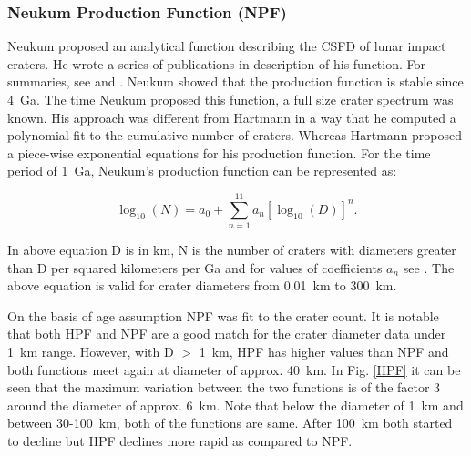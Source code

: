 \documentclass[11pt]{article}
\begin{document}
\subsubsection{Neukum Production Function (NPF)}
Neukum proposed an analytical function describing the CSFD of lunar impact craters. He wrote a series of publications in description of his function. For summaries, see \cite{neukum1994crater} and \cite{neukum1983meteoritenbombardement}. Neukum showed that the production function is stable since \SI{4}{Ga}. The time Neukum proposed this function, a full size crater spectrum was known. His approach was different from Hartmann in a way that he computed a polynomial fit to the cumulative number of craters. Whereas Hartmann proposed a piece-wise exponential equations for his production function. For the time period of \SI{1}{Ga}, Neukum's production function can be represented as:

\begin{equation}
\log_{10} (N) = a_0 + \sum_{n=1}^{11} a_n[\log_{10} (D)]^n.
\end{equation}

In above equation D is in km, N is the number of craters with diameters greater than D per squared kilometers per Ga and for values of coefficients $a_n$ see \cite{ivanov2002comparison}. The above equation is valid for crater diameters from \SI{0.01}{km} to \SI{300}{km}.

On the basis of age assumption NPF was fit to the crater count. It is notable that both HPF and NPF are a good match for the crater diameter data under \SI{1}{km} range. However, with D $>$ \SI{1}{km}, HPF has higher values than NPF and both functions meet again at diameter of approx. \SI{40}{km}. In Fig. \ref{HPF} it can be seen that the maximum variation between the two functions is of the factor 3 around the diameter of approx. \SI{6}{km}. Note that below the diameter of \SI{1}{km} and between 30-\SI{100}{km}, both of the functions are same. After \SI{100}{km} both started to decline but HPF declines more rapid as compared to NPF.
\end{document}
